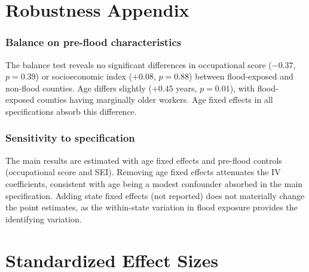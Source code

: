 \documentclass[12pt]{article}
\begin{document}
\section{Robustness Appendix}

\subsubsection*{Balance on pre-flood characteristics} The balance test reveals no significant differences in occupational score ($-0.37$, $p = 0.39$) or socioeconomic index ($+0.08$, $p = 0.88$) between flood-exposed and non-flood counties. Age differs slightly ($+0.45$ years, $p = 0.01$), with flood-exposed counties having marginally older workers. Age fixed effects in all specifications absorb this difference.

\subsubsection*{Sensitivity to specification} The main results are estimated with age fixed effects and pre-flood controls (occupational score and SEI). Removing age fixed effects attenuates the IV coefficients, consistent with age being a modest confounder absorbed in the main specification. Adding state fixed effects (not reported) does not materially change the point estimates, as the within-state variation in flood exposure provides the identifying variation.


\section{Standardized Effect Sizes}
\label{sec:sde}


\end{document}

